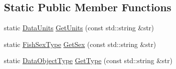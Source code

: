 \subsection*{Static Public Member Functions}
\begin{DoxyCompactItemize}
\item 
static \hyperlink{namespacemas_a7e15982b9bc2fc35b571bceea4f85a6b}{Data\-Units} \hyperlink{structmas_1_1_data_object_a9da63af7bf2f0777350de9ffb5001c1a}{Get\-Units} (const std\-::string \&str)
\item 
static \hyperlink{namespacemas_a177aaabcef4ec0c3f390a7c9f6ad563b}{Fish\-Sex\-Type} \hyperlink{structmas_1_1_data_object_ab4075e8fbd70a451fb6bf370a28e9c79}{Get\-Sex} (const std\-::string \&str)
\item 
static \hyperlink{namespacemas_a011cdbd288b3370538941f20c874de27}{Data\-Object\-Type} \hyperlink{structmas_1_1_data_object_aea6931b57dcd43a63ebf7e9139116b8b}{Get\-Type} (const std\-::string \&str)
\end{DoxyCompactItemize}
